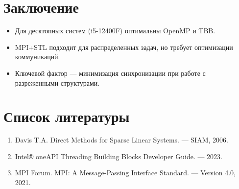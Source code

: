 \documentclass[a4paper,12pt]{article}
\begin{document}
\section{Заключение}
\begin{itemize}
\item Для десктопных систем (i5-12400F) оптимальны OpenMP и TBB.
\item MPI+STL подходит для распределенных задач, но требует оптимизации коммуникаций.
\item Ключевой фактор — минимизация синхронизации при работе с разреженными структурами.
\end{itemize}

\section{Список литературы}
\begin{enumerate}
\item Davis T.A. Direct Methods for Sparse Linear Systems. — SIAM, 2006.
\item Intel® oneAPI Threading Building Blocks Developer Guide. — 2023.
\item MPI Forum. MPI: A Message-Passing Interface Standard. — Version 4.0, 2021.
\end{enumerate}
\end{document}
